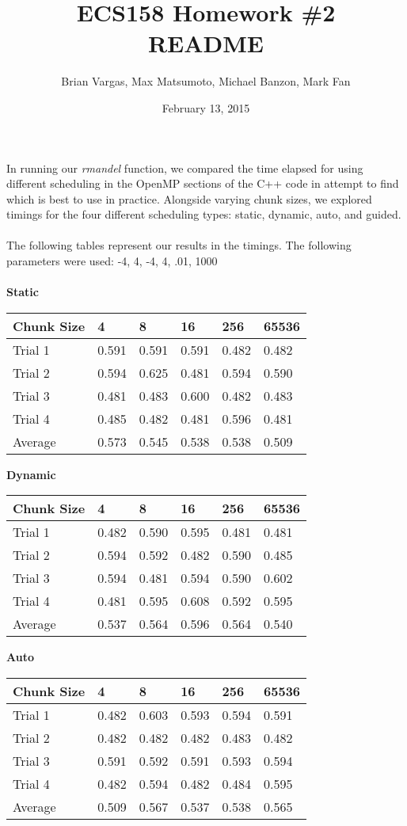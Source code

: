\documentclass{article}
\title{ECS158 Homework \#2 \\ README}
\author{Brian Vargas, Max Matsumoto, Michael Banzon, Mark Fan}
\date{February 13, 2015}
\begin{document}
\maketitle

In running our \emph{rmandel} function, we compared the time elapsed for using different scheduling in the OpenMP sections of the C++ code in attempt to find which is best to use in practice. Alongside varying chunk sizes, we explored timings for the four different scheduling types: static, dynamic, auto, and guided.
\\ \\
The following tables represent our results in the timings. The following parameters were used: -4, 4, -4, 4, .01, 1000
\\ \\
\textbf{Static} \\
\begin{tabular}{l|l l l l l}
\hline Chunk Size&4&8&16&256&65536 \\ \hline
Trial 1&0.591&0.591&0.591&0.482&0.482 \\
Trial 2&0.594&0.625&0.481&0.594&0.590 \\
Trial 3&0.481&0.483&0.600&0.482&0.483 \\
Trial 4&0.485&0.482&0.481&0.596&0.481 \\
Average&0.573&0.545&0.538&0.538&0.509 \end{tabular}

\textbf{Dynamic} \\
\begin{tabular}{l|l l l l l}
\hline Chunk Size&4&8&16&256&65536 \\ \hline
Trial 1&0.482&0.590&0.595&0.481&0.481 \\
Trial 2&0.594&0.592&0.482&0.590&0.485 \\
Trial 3&0.594&0.481&0.594&0.590&0.602 \\
Trial 4&0.481&0.595&0.608&0.592&0.595 \\
Average&0.537&0.564&0.596&0.564&0.540 \end{tabular}

\textbf{Auto} \\
\begin{tabular}{l|l l l l l}
\hline Chunk Size&4&8&16&256&65536 \\ \hline
Trial 1&0.482&0.603&0.593&0.594&0.591 \\
Trial 2&0.482&0.482&0.482&0.483&0.482 \\
Trial 3&0.591&0.592&0.591&0.593&0.594 \\
Trial 4&0.482&0.594&0.482&0.484&0.595 \\
Average&0.509&0.567&0.537&0.538&0.565
\end{tabular}
\end{document}
